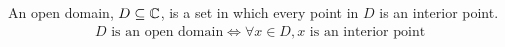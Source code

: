 \begin{definition}
    An open domain, $D\subseteq\mathbb{C}$, is a set in which every point in $D$ is an interior point.
    \begin{align}
        \text{$D$ is an open domain}\iff\forall x\in D,\text{$x$ is an interior point}
    \end{align}
\end{definition}
